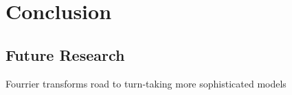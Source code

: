 
\chapter{Conclusion}
\label{ch:conclusion}
\section{Future Research}
\label{sec:conclusionfuture}
Fourrier transforms
road to turn-taking
more sophisticated models